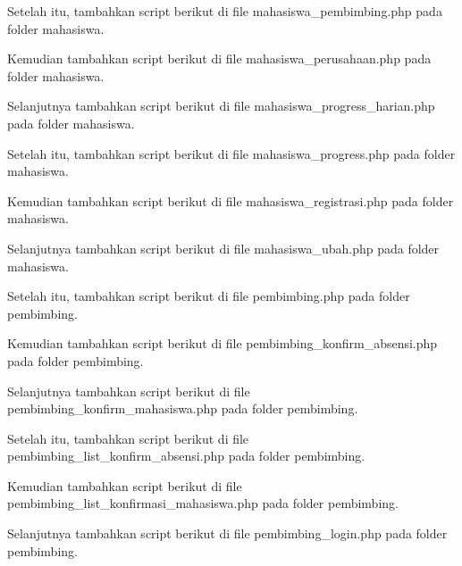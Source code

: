 \noindent
Setelah itu, tambahkan script berikut di file mahasiswa\_pembimbing.php pada folder mahasiswa.


\noindent
Kemudian tambahkan script berikut di file mahasiswa\_perusahaan.php pada folder mahasiswa.


\noindent
Selanjutnya tambahkan script berikut di file mahasiswa\_progress\_harian.php pada folder mahasiswa.


\noindent
Setelah itu, tambahkan script berikut di file mahasiswa\_progress.php pada folder mahasiswa.


\noindent
Kemudian tambahkan script berikut di file mahasiswa\_registrasi.php pada folder mahasiswa.


\noindent
Selanjutnya tambahkan script berikut di file mahasiswa\_ubah.php pada folder mahasiswa.


\noindent
Setelah itu, tambahkan script berikut di file pembimbing.php pada folder pembimbing.


\noindent
Kemudian tambahkan script berikut di file pembimbing\_konfirm\_absensi.php pada folder pembimbing.


\noindent
Selanjutnya tambahkan script berikut di file pembimbing\_konfirm\_mahasiswa.php pada folder pembimbing.


\noindent
Setelah itu, tambahkan script berikut di file pembimbing\_list\_konfirm\_absensi.php pada folder pembimbing.


\noindent
Kemudian tambahkan script berikut di file pembimbing\_list\_konfirmasi\_mahasiswa.php pada folder pembimbing.


\noindent
Selanjutnya tambahkan script berikut di file pembimbing\_login.php pada folder pembimbing.


